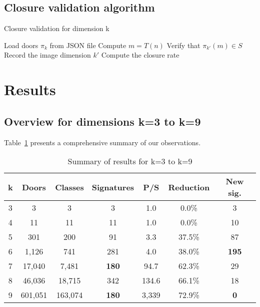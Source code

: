 \documentclass[12pt,a4paper]{article}
\theoremstyle{remark}
\begin{document}
\subsection{Closure validation algorithm}

\begin{algorithm}
\caption{Closure validation for dimension k}
\begin{algorithmic}
\STATE Load doors $\pi_k$ from JSON file
        \STATE Compute $m = T(n)$
        \STATE Verify that $\pi_{k'}(m) \in S$
        \STATE Record the image dimension $k'$
    \ENDIF
\ENDFOR
\STATE Compute the closure rate
\end{algorithmic}
\end{algorithm}


\section{Results}
\label{sec:results}

\subsection{Overview for dimensions k=3 to k=9}

Table~\ref{tab:synthese} presents a comprehensive summary of our observations.

\begin{table}[h]
\centering
\caption{Summary of results for k=3 to k=9}
\label{tab:synthese}
\begin{tabular}{ccccccc}
\toprule
\textbf{k} & \textbf{Doors} & \textbf{Classes} & \textbf{Signatures} & \textbf{P/S} & \textbf{Reduction} & \textbf{New sig.}\\
\midrule
3 & 3 & 3 & 3 & 1.0 & 0.0\% & 3\\
4 & 11 & 11 & 11 & 1.0 & 0.0\% & 10\\
5 & 301 & 200 & 91 & 3.3 & 37.5\% & 87\\
6 & 1,126 & 741 & 281 & 4.0 & 38.0\% & \textbf{195}\\
7 & 17,040 & 7,481 & \textbf{180} & 94.7 & 62.3\% & 29\\
8 & 46,036 & 18,715 & 342 & 134.6 & 66.1\% & 18\\
9 & 601,051 & 163,074 & \textbf{180} & 3,339 & 72.9\% & \textbf{0}\\
\bottomrule
\end{tabular}
\end{table}
\end{document}
